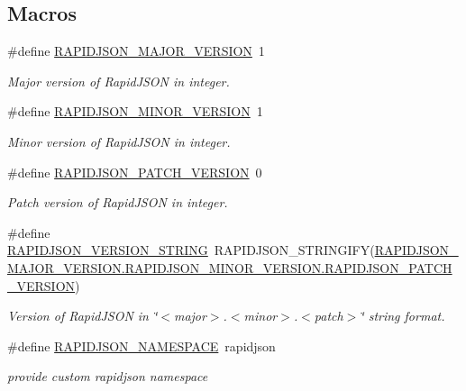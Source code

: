 \subsection*{Macros}
\begin{DoxyCompactItemize}
\item 
\#define \hyperlink{a00636_gaf1ff1685be6cbebb5d4b2ab997776f45}{R\+A\+P\+I\+D\+J\+S\+O\+N\+\_\+\+M\+A\+J\+O\+R\+\_\+\+V\+E\+R\+S\+I\+ON}~1
\begin{DoxyCompactList}\small\item\em Major version of Rapid\+J\+S\+ON in integer. \end{DoxyCompactList}\item 
\#define \hyperlink{a00636_gaf9125105c593a636a79f1c2d96835376}{R\+A\+P\+I\+D\+J\+S\+O\+N\+\_\+\+M\+I\+N\+O\+R\+\_\+\+V\+E\+R\+S\+I\+ON}~1
\begin{DoxyCompactList}\small\item\em Minor version of Rapid\+J\+S\+ON in integer. \end{DoxyCompactList}\item 
\#define \hyperlink{a00636_gaf967d31be43666ce7f53756d73bd1cdf}{R\+A\+P\+I\+D\+J\+S\+O\+N\+\_\+\+P\+A\+T\+C\+H\+\_\+\+V\+E\+R\+S\+I\+ON}~0
\begin{DoxyCompactList}\small\item\em Patch version of Rapid\+J\+S\+ON in integer. \end{DoxyCompactList}\item 
\#define \hyperlink{a00636_gad283cfde97d9a32b7d8e8107b11f70a6}{R\+A\+P\+I\+D\+J\+S\+O\+N\+\_\+\+V\+E\+R\+S\+I\+O\+N\+\_\+\+S\+T\+R\+I\+NG}~R\+A\+P\+I\+D\+J\+S\+O\+N\+\_\+\+S\+T\+R\+I\+N\+G\+I\+FY(\hyperlink{a00636_gaf967d31be43666ce7f53756d73bd1cdf}{R\+A\+P\+I\+D\+J\+S\+O\+N\+\_\+\+M\+A\+J\+O\+R\+\_\+\+V\+E\+R\+S\+I\+O\+N.\+R\+A\+P\+I\+D\+J\+S\+O\+N\+\_\+\+M\+I\+N\+O\+R\+\_\+\+V\+E\+R\+S\+I\+O\+N.\+R\+A\+P\+I\+D\+J\+S\+O\+N\+\_\+\+P\+A\+T\+C\+H\+\_\+\+V\+E\+R\+S\+I\+ON})
\begin{DoxyCompactList}\small\item\em Version of Rapid\+J\+S\+ON in \char`\"{}$<$major$>$.$<$minor$>$.$<$patch$>$\char`\"{} string format. \end{DoxyCompactList}\item 
\#define \hyperlink{a00636_ga743a79d3af927391fe3eb5c979136899}{R\+A\+P\+I\+D\+J\+S\+O\+N\+\_\+\+N\+A\+M\+E\+S\+P\+A\+CE}~rapidjson
\begin{DoxyCompactList}\small\item\em provide custom rapidjson namespace \end{DoxyCompactList}\item 

\end{DoxyCompactItemize}
